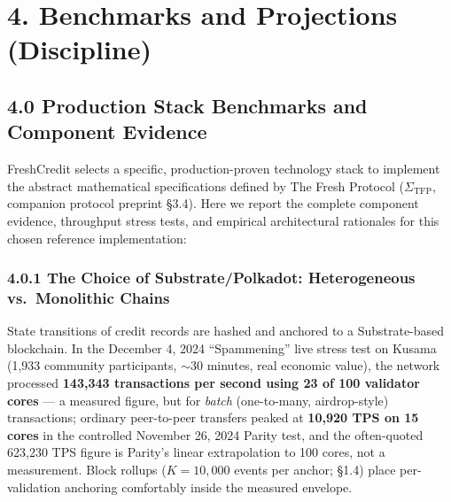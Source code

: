 \documentclass[
]{article}
\begin{document}
\section{4. Benchmarks and Projections
(Discipline)}\label{benchmarks-and-projections-discipline}

\subsection{4.0 Production Stack Benchmarks and Component
Evidence}\label{production-stack-benchmarks-and-component-evidence}

FreshCredit selects a specific, production-proven technology stack to
implement the abstract mathematical specifications defined by The Fresh
Protocol (\(\Sigma_{\text{TFP}}\), companion protocol preprint §3.4).
Here we report the complete component evidence, throughput stress tests,
and empirical architectural rationales for this chosen reference
implementation:

\subsubsection{4.0.1 The Choice of Substrate/Polkadot: Heterogeneous
vs.~Monolithic
Chains}\label{the-choice-of-substratepolkadot-heterogeneous-vs.-monolithic-chains}

State transitions of credit records are hashed and anchored to a
Substrate-based blockchain. In the December 4, 2024 ``Spammening'' live
stress test on Kusama (1,933 community participants, \(\sim\)30 minutes,
real economic value), the network processed \textbf{143,343 transactions
per second using 23 of 100 validator cores} --- a measured figure, but
for \emph{batch} (one-to-many, airdrop-style) transactions; ordinary
peer-to-peer transfers peaked at \textbf{10,920 TPS on 15 cores} in the
controlled November 26, 2024 Parity test, and the often-quoted 623,230
TPS figure is Parity's linear extrapolation to 100 cores, not a
measurement. Block rollups (\(K = 10,000\) events per anchor; §1.4)
place per-validation anchoring comfortably inside the measured envelope.
\end{document}
